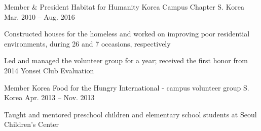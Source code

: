 


\begin{cventries}


\cventry
{Member \& President} %
{Habitat for Humanity Korea Campus Chapter} %
{S. Korea} %
{Mar. 2010 – Aug. 2016} %
{ %
\begin{cvitems}
\item {Constructed houses for the homeless and worked on improving poor residential environments, during 26 and 7 occasions, respectively}
\item {Led and managed the volunteer group for a year; received the first honor from 2014 Yonsei Club Evaluation}
\end{cvitems}
}


\cventry
{Member} %
{Korea Food for the Hungry International - campus volunteer group} %
{S. Korea} %
{Apr. 2013 – Nov. 2013} %
{ %
\begin{cvitems}
\item {Taught and mentored preschool children and elementary school students at Seoul Children’s Center}
\end{cvitems}
}


\end{cventries}